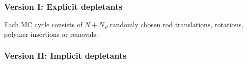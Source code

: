 \subsubsection{Version I: Explicit depletants}

Each MC cycle consists of $N + N_{P}$ randomly chosen rod translations, rotations, polymer insertions or removals.

\subsubsection{Version II: Implicit depletants}





